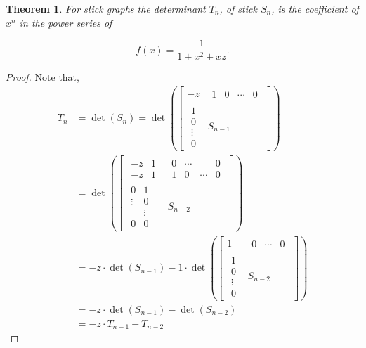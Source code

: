 \documentclass[12pt]{amsart}
\newtheorem{theorem}{Theorem}[section]
\theoremstyle{remark}
\numberwithin{equation}{section}
\begin{document}
    \begin{theorem}
        For stick graphs the determinant $T_n$, of stick $S_n$, is the coefficient of $x^n$ in the power series of 
        
        \[f(x) = \frac{1}{1+x^2+xz}.\]
    \end{theorem}
    \begin{proof}
        Note that, \begin{align*}
            T_n &= \det(S_n) = \det \left(\left[\begin{array}{c|c}
    -z & \begin{matrix} 1 & 0 & \cdots & 0 \end{matrix} \\
    \hline \begin{matrix}
         1 \\ 0 \\ \vdots \\ 0
     \end{matrix}& S_{n-1}
    \end{array}\right]\right) \\
            &= \det \left(\left[\begin{array}{c|c}
    \begin{matrix} -z & 1 \\ -z & 1 \end{matrix} &
    \begin{matrix}0 & \cdots & & 0\\ 1 & 0 & \cdots & 0\end{matrix}\\ \hline
     \begin{matrix} 0&1 \\ \vdots&0 \\ & \vdots\\ 0&0\end{matrix} & S_{n-2}
    \end{array}\right]\right)\\
            &= -z \cdot \det(S_{n-1}) - 1 \cdot \det \left(\left[\begin{array}{c|c}
                1 & \begin{matrix} 0 & \cdots & 0 \end{matrix} \\ \hline
                \begin{matrix} 1 \\ 0 \\ \vdots \\ 0  \end{matrix} & S_{n-2}
            \end{array}\right]\right)\\
            &= -z \cdot \det(S_{n-1}) - \det(S_{n-2}) \\
            &= -z \cdot T_{n-1} - T_{n-2}
        \end{align*}


\end{proof}
\end{document}
